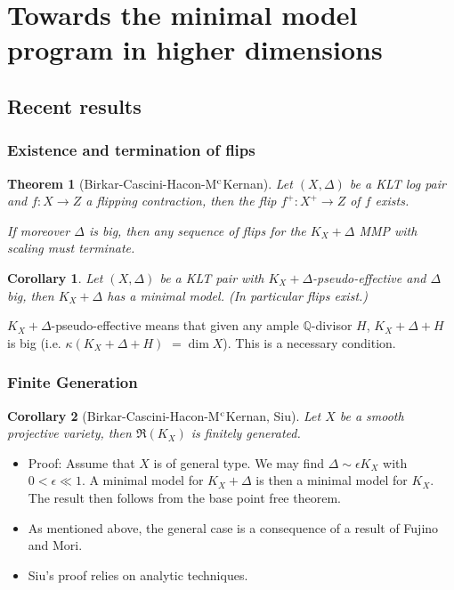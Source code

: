 \documentclass{beamer}
\theoremstyle{plain}
\newtheorem*{thm}{Theorem}
\newtheorem*{cor}{Corollary}
\theoremstyle{definition}
\theoremstyle{remark}
\begin{document}
\section{Towards the minimal model program in higher dimensions}
\subsection{Recent results}

\begin{frame}
 \frametitle{Existence and termination of flips}
\begin{thm}[Birkar-Cascini-Hacon-M$^{\rm c}$Kernan] Let $(X,\Delta)$ be a KLT log pair and $f:X\to Z$ a flipping contraction, then the flip $f^+:X^+\to Z$ of $f$ exists.

If moreover $\Delta $ is big, then any sequence of flips for the $K_X+\Delta$ MMP with scaling must terminate.\end{thm}
\begin{cor} Let $(X,\Delta )$ be a KLT pair with $K_X+\Delta$-pseudo-effective
and $\Delta$ big, then $K_X+\Delta$ has a minimal model. (In particular flips exist.)
\end{cor}
$K_X+\Delta$-pseudo-effective means that given any ample $\mathbb{Q}$-divisor $H$, $K_X+\Delta+H$ is big (i.e. $\kappa (K_X+\Delta+H)$ $=\dim X$).
This is a necessary condition.

\end{frame}

\begin{frame}
\frametitle{Finite Generation}
\begin{cor} [Birkar-Cascini-Hacon-M$^{\rm c}$Kernan, Siu]
Let $X$ be a smooth projective variety, then
$\mathfrak{R}(K_X)$ is finitely generated.
\end{cor}
\begin{itemize}\item Proof: Assume that $X$ is of general type.
We may find $\Delta \sim \epsilon K_X$ with $0<\epsilon \ll 1$.
A minimal model for $K_X+\Delta$ is then a minimal model for $K_X$.
The result then follows from the base point free theorem.
\item As mentioned above, the general case is a consequence of a result of Fujino and Mori.
\item Siu's proof relies on analytic techniques.
\end{itemize}
\end{frame}
\end{document}
